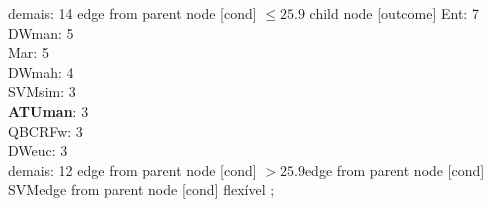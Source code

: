 {{{{%
demais: 14} edge from parent node [cond] {$\leq25.9$}}
child {node [outcome] {
Ent: 7\\
DWman: 5\\
Mar: 5\\
DWmah: 4\\
SVMsim: 3\\
\textbf{ATUman}: 3\\
QBCRFw: 3\\
DWeuc: 3\\
demais: 12} edge from parent node [cond] {$>25.9$}}edge from parent node [cond] {SVM}}edge from parent node [cond] {flex{\'i}vel}}
;